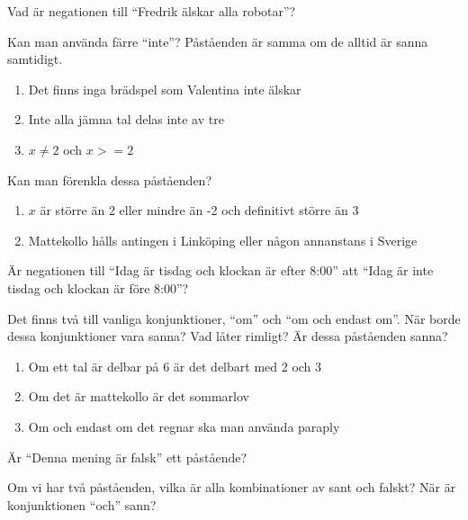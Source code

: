 \begin{problem}
	Vad är negationen till ``Fredrik älskar alla robotar''?
\end{problem}

\begin{problem}
	Kan man använda färre ``inte''? Påståenden är samma om de alltid är sanna samtidigt.
	\begin{enumerate}
		\item Det finns inga brädspel som Valentina inte älskar
		\item Inte alla jämna tal delas inte av tre
		\item \(x \neq 2\) och \(x>= 2\) 
	\end{enumerate}
\end{problem}

\begin{problem}
	Kan man förenkla dessa påståenden?
	\begin{enumerate}
		\item \(x\) är större än 2 eller mindre än -2 och definitivt större än 3
		\item Mattekollo hålls antingen i Linköping eller någon annanstans i Sverige
	\end{enumerate}
\end{problem}

\begin{problem}
	Är negationen till ``Idag är tisdag och klockan är efter 8:00'' att ``Idag är inte tisdag och klockan är före 8:00''?
\end{problem}

\begin{problem}[Extra]
	Det finns två till vanliga konjunktioner, ``om'' och ``om och endast om''. När borde dessa konjunktioner vara sanna? Vad låter rimligt? Är dessa påståenden sanna?
	\begin{enumerate}
		\item Om ett tal är delbar på 6 är det delbart med 2 och 3
		\item Om det är mattekollo är det sommarlov
		\item Om och endast om det regnar ska man använda paraply
	\end{enumerate}
\end{problem}

\begin{problem}[Extra]
	Är ``Denna mening är falsk'' ett påstående?
\end{problem}

\begin{problem}[Extra]
	Om vi har två påståenden, vilka är alla kombinationer av sant och falskt? När är konjunktionen ``och'' sann?
\end{problem}

